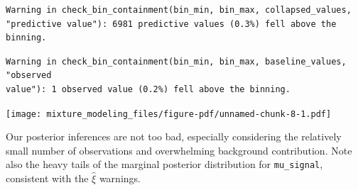 \documentclass[
  letterpaper,
  DIV=11,
  numbers=noendperiod]{scrartcl}
\begin{document}
\begin{verbatim}
Warning in check_bin_containment(bin_min, bin_max, collapsed_values,
"predictive value"): 6981 predictive values (0.3%) fell above the binning.
\end{verbatim}

\begin{verbatim}
Warning in check_bin_containment(bin_min, bin_max, baseline_values, "observed
value"): 1 observed value (0.2%) fell above the binning.
\end{verbatim}

\texttt{[image: mixture\_modeling\_files/figure-pdf/unnamed-chunk-8-1.pdf]}

Our posterior inferences are not too bad, especially considering the
relatively small number of observations and overwhelming background
contribution. Note also the heavy tails of the marginal posterior
distribution for \texttt{mu\_signal}, consistent with the \(\hat{\xi}\)
warnings.
\end{document}
